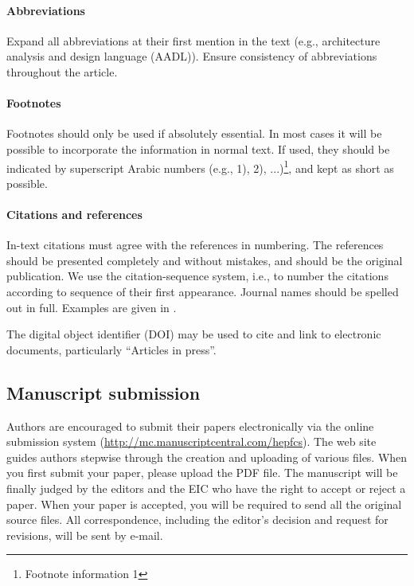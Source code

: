 \documentclass[review]{fcs}
\begin{document}
\paragraph{Abbreviations}

Expand all abbreviations at their first mention in the text (e.g., architecture analysis and design language (AADL)). Ensure consistency of abbreviations throughout the article.

\paragraph{Footnotes}

Footnotes should only be used if absolutely essential. In most cases it will be possible to incorporate the information in normal text. If used, they should be indicated by superscript Arabic numbers (e.g., 1), 2), ...)\footnote{Footnote information 1}, and kept as short as possible. 

\paragraph{Citations and references}

In-text citations must agree with the references in numbering. The references should be presented completely and without mistakes, and should be the original publication. We use the citation-sequence system, i.e., to number the citations according to sequence of their first appearance. Journal names should be spelled out in full. Examples are given in \cite{1,2,3}.

The digital object identifier (DOI) may be used to cite and link to electronic documents, particularly ``Articles in press''.


\subsection{Manuscript submission}

Authors are encouraged to submit their papers electronically via the online submission system (\url{http://mc.manuscriptcentral.com/hepfcs}). The web site guides authors stepwise through the creation and uploading of various files. When you first submit your paper, please upload the PDF file. The manuscript will be finally judged by the editors and the EIC who have the right to accept or reject a paper. When your paper is accepted, you will be required to send all the original source files. All correspondence, including the editor’s decision and request for revisions, will be sent by e-mail. 
\end{document}
